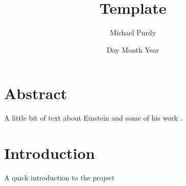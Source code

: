 \documentclass[a4paper, 12pt]{article}
\title{Template}
\author{Michael Purdy}
\date{Day Month Year}
\begin{document}
\maketitle

\newpage

\section*{Abstract}

A little bit of text about Einstein and some of his work \cite{einstein}.

\section{Introduction}

A quick introduction to the project

\printbibliography
\end{document}

